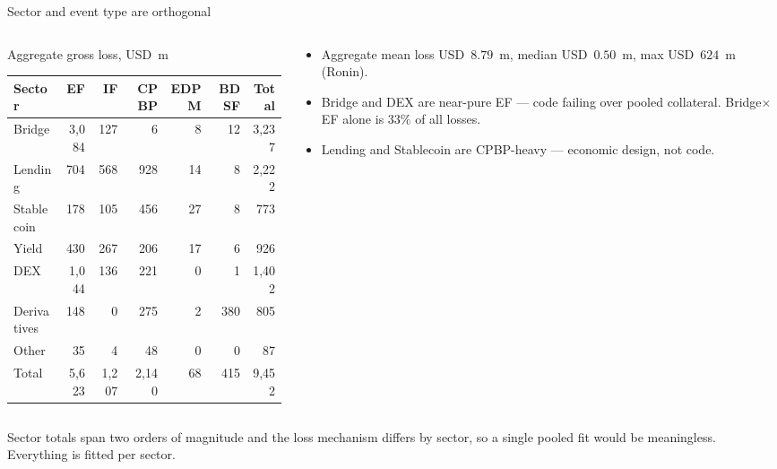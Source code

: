 \documentclass[10pt,xcolor=x11names,aspectratio=169]{beamer}
\begin{document}
\begin{frame}{Sector and event type are orthogonal}
  \begin{columns}[T]
    \begin{column}{0.55\textwidth}
      \footnotesize\setlength{\tabcolsep}{3pt}
      Aggregate gross loss, USD~m
      \begin{tabular}{l r r r r r r}
        \toprule
        Sector & EF & IF & CPBP & EDPM & BDSF & Total \\
        \midrule
        Bridge      & 3{,}084 &  127 &   6 &  8 &  12 & 3{,}237 \\
        Lending     &    704 &  568 & 928 & 14 &   8 & 2{,}222 \\
        Stablecoin  &    178 &  105 & 456 & 27 &   8 &   773 \\
        Yield       &    430 &  267 & 206 & 17 &   6 &   926 \\
        DEX         & 1{,}044 &  136 & 221 &  0 &   1 & 1{,}402 \\
        Derivatives &    148 &    0 & 275 &  2 & 380 &   805 \\
        Other       &     35 &    4 &  48 &  0 &   0 &    87 \\
        \midrule
        Total & 5{,}623 & 1{,}207 & 2{,}140 & 68 & 415 & 9{,}452 \\
        \bottomrule
      \end{tabular}
    \end{column}
    \begin{column}{0.41\textwidth}
      \small
      \begin{itemize}
        \item Aggregate mean loss USD~$8.79$~m, median USD~$0.50$~m,
              max USD~$624$~m (Ronin).
        \item Bridge and DEX are near-pure EF --- code failing over pooled
              collateral. Bridge$\times$EF alone is $33\%$ of all losses.
        \item Lending and Stablecoin are CPBP-heavy --- economic design,
              not code.
      \end{itemize}
    \end{column}
  \end{columns}
  \begin{pitfall}
    Sector totals span two orders of magnitude and the loss mechanism differs
    by sector, so a single pooled fit would be meaningless. Everything is
    fitted per sector.
  \end{pitfall}
\end{frame}
\end{document}
